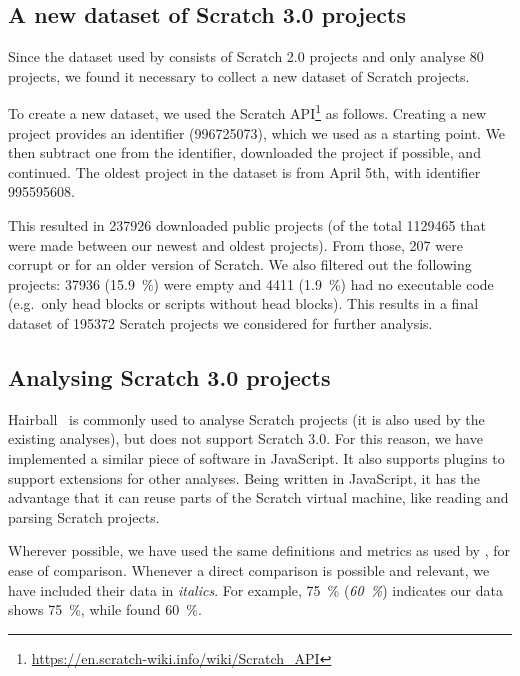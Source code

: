 \documentclass[../main]{subfiles}
\begin{document}
\subsection{A new dataset of Scratch 3.0 projects}\label{subsec:a-new-dataset-of-scratch-projects}

Since the dataset used by \textcite{aivaloglouHowKidsCode2016} consists of Scratch 2.0 projects and \textcite{fronzaApproachEvaluateComplexity2020} only analyse 80 projects, we found it necessary to collect a new dataset of Scratch projects.

To create a new dataset, we used the Scratch API\footnote{\url{https://en.scratch-wiki.info/wiki/Scratch_API}} as follows.
Creating a new project provides an identifier ({996725073}), which we used as a starting point.
We then subtract one from the identifier, downloaded the project if possible, and continued.
The oldest project in the dataset is from April 5th, with identifier {995595608}.

This resulted in \num{237926} downloaded public projects (of the total \num{1129465} that were made between our newest and oldest projects).
From those, \num{207} were corrupt or for an older version of Scratch.
We also filtered out the following projects: \num{37936} (\qty{15.9}{\percent}) were empty and \num{4411} (\qty{1.9}{\percent}) had no executable code (e.g.\ only head blocks or scripts without head blocks).
This results in a final dataset of \num{195372} Scratch projects we considered for further analysis.

\subsection{Analysing Scratch 3.0 projects}\label{subsec:analysing-scratch-3.0-projects}

Hairball~\autocite{boeHairballLintinspiredStatic2013} is commonly used to analyse Scratch projects (it is also used by the existing analyses), but does not support Scratch 3.0.
For this reason, we have implemented a similar piece of software in JavaScript.
It also supports plugins to support extensions for other analyses.
Being written in JavaScript, it has the advantage that it can reuse parts of the Scratch virtual machine, like reading and parsing Scratch projects.

Wherever possible, we have used the same definitions and metrics as used by \textcite{aivaloglouHowKidsCode2016}, for ease of comparison.
Whenever a direct comparison is possible and relevant, we have included their data in \textit{italics}.
For example, \qty{75}{\percent} (\textit{\qty{60}{\percent}}) indicates our data shows \qty{75}{\percent}, while \citeauthor{aivaloglouHowKidsCode2016} found \qty{60}{\percent}.
\end{document}
